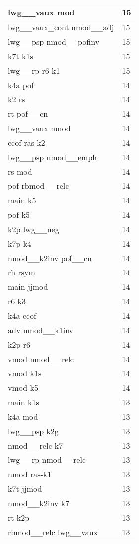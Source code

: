 \documentclass[a4 paper]{article}
\begin{document}
\begin{longtable}{p{}p{}}
lwg\_\_vaux mod  & 15 \\ \midrule
lwg\_\_vaux\_cont nmod\_\_adj  & 15 \\ \midrule
lwg\_\_psp nmod\_\_pofinv  & 15 \\ \midrule
k7t k1s  & 15 \\ \midrule
lwg\_\_rp r6-k1  & 15 \\ \midrule
k4a pof  & 14 \\ \midrule
k2 rs  & 14 \\ \midrule
rt pof\_\_cn  & 14 \\ \midrule
lwg\_\_vaux nmod  & 14 \\ \midrule
ccof ras-k2  & 14 \\ \midrule
lwg\_\_psp nmod\_\_emph  & 14 \\ \midrule
rs mod  & 14 \\ \midrule
pof rbmod\_\_relc  & 14 \\ \midrule
main k5  & 14 \\ \midrule
pof k5  & 14 \\ \midrule
k2p lwg\_\_neg  & 14 \\ \midrule
k7p k4  & 14 \\ \midrule
nmod\_\_k2inv pof\_\_cn  & 14 \\ \midrule
rh rsym  & 14 \\ \midrule
main jjmod  & 14 \\ \midrule
r6 k3  & 14 \\ \midrule
k4a ccof  & 14 \\ \midrule
adv nmod\_\_k1inv  & 14 \\ \midrule
k2p r6  & 14 \\ \midrule
vmod nmod\_\_relc  & 14 \\ \midrule
vmod k1s  & 14 \\ \midrule
vmod k5  & 14 \\ \midrule
main k1s  & 13 \\ \midrule
k4a mod  & 13 \\ \midrule
lwg\_\_psp k2g  & 13 \\ \midrule
nmod\_\_relc k7  & 13 \\ \midrule
lwg\_\_rp nmod\_\_relc  & 13 \\ \midrule
nmod ras-k1  & 13 \\ \midrule
k7t jjmod  & 13 \\ \midrule
nmod\_\_k2inv k7  & 13 \\ \midrule
rt k2p  & 13 \\ \midrule
rbmod\_\_relc lwg\_\_vaux  & 13 \\ \midrule

\end{longtable}
\end{document}
